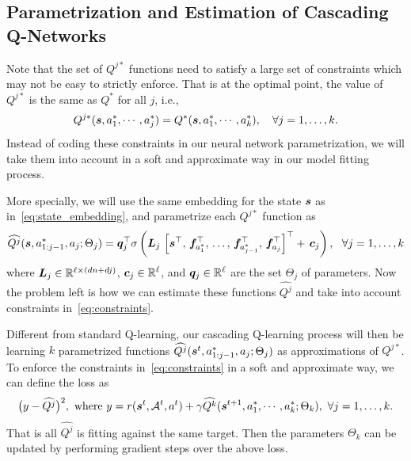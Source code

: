 \documentclass{article} %
\newcommand{\Li}[1]{{\color{cyan}{\bf\sf [Li: #1]}}}
\begin{document}
\vspace{-3mm}
\subsection{Parametrization and Estimation of Cascading Q-Networks} 
\vspace{-3mm}

Note that the set of $Q^{j*}$ functions need to satisfy a large set of constraints which may not be easy to strictly enforce. That is at the optimal point, the value of $Q^{j*}$ is the same as $Q^*$ for all $j$, i.e., 
{\small \begin{equation}
    \label{eq:constraints}
        Q^{j*}({\bm{s}}, a_1^*, \cdots, a_j^*) = Q^*({\bm{s}},a_1^*,\cdots,a_k^*),\quad \forall j=1,\ldots, k.
\end{equation}}
Instead of coding these constraints in our neural network parametrization, we will take them into account in a soft and approximate way in our model fitting process. 

More specially, we will use the same embedding for the state ${\bm{s}}$ as in~\eqref{eq:state_embedding}, and parametrize each $Q^{j*}$ function as
{\small \begin{equation}
    \widehat{Q^{j}}({\bm{s}}, a_{1:j-1}^*, a_j; \Theta_j) = {\bm{q}}_j^\top \sigma \left( {\bm{L}}_j\,
        \left[
            {\bm{s}}^\top,\,  
            {\bm{f}}_{a_1^*}^\top,\, 
            \ldots,\,
            {\bm{f}}_{a_{j-1}^*}^\top,\,
            {\bm{f}}_{a_j}^\top
        \right]^\top
        +\, {\bm{c}}_j
    \right),~~\forall j=1,\ldots,k
\end{equation}}
where ${\bm{L}}_j \in {\mathbb{R}}^{\ell\times(dn+dj)}$, ${\bm{c}}_j \in {\mathbb{R}}^{\ell}$, and ${\bm{q}}_j \in {\mathbb{R}}^{\ell}$ are the set $\Theta_j$ of parameters. Now the problem left is how we can estimate these functions $\widehat{Q^{j}}$ and take into account constraints in~\eqref{eq:constraints}. 

Different from standard Q-learning, our cascading Q-learning process will then be learning $k$ parametrized functions $\widehat{Q^j}({\bm{s}}^t, a_{1:j-1}^*, a_j; \Theta_j)$ as approximations of $Q^{j*}$. To enforce the constraints in~\eqref{eq:constraints} in a soft and approximate way, we can define the loss as
{\small \begin{equation}
\label{eq:loss}
\big(y- \widehat{Q^j} \big)^2,~\text{where}~y= r({\bm{s}}^t, {\mathcal{A}}^t, a^t) + \gamma \widehat{Q^{k}}({\bm{s}}^{t+1}, a_1^*,\cdots,a_k^*; \Theta_k),~ \forall j=1,\ldots,k.
\end{equation}}
That is all $\widehat{Q^j}$ is fitting against the same target. Then the parameters $\Theta_k$ can be updated by performing gradient \Li{descent} steps over the above loss. 
\end{document}

